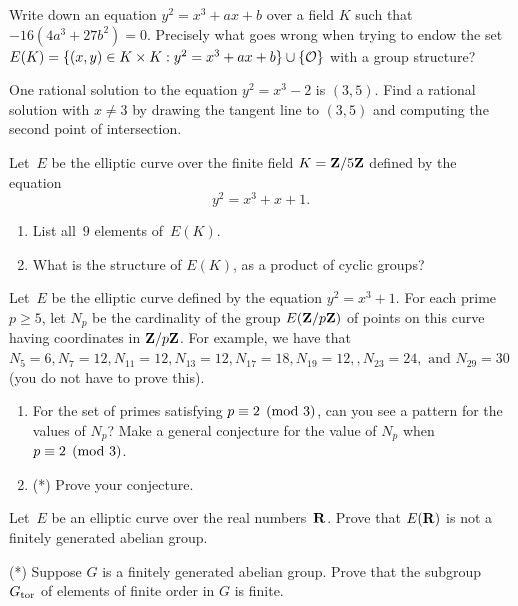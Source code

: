 \begin{exercises}
\item\label{ex:singgrp} Write down an equation $y^2 = x^3 +ax + b$ over a field
$K$ such that $-16(4a^3+27b^2)= 0$.  Precisely what goes wrong
when trying to endow the set
$E(K) = \{ (x,y)\in K\times K : y^2 = x^3 + ax +b \} \cup \{\mathcal{O}\}$
with a group structure?

\item\label{ex:ell2} One rational solution to the equation
$y^2=x^3-2$ is $(3,5)$.  Find a rational solution with $x\neq 3$ by
drawing the tangent line to $(3,5)$ and computing the second point of
intersection.

\item\label{ex:ell4}
Let~$E$ be the elliptic curve over the finite
field $K=\mathbf{Z}/5\mathbf{Z}$ defined by the equation
$$
y^2 = x^3 + x +1.
$$
\begin{enumerate}
\item List all~$9$ elements of~$E(K)$.
\item What is the structure of
$E(K)$, as a product of cyclic groups?
\end{enumerate}

\item\label{ex:ell11}
Let~$E$ be the elliptic curve
defined by the equation $y^2 = x^3 +1$.
For each prime $p\geq 5$, let $N_p$ be the cardinality of the group
$E(\mathbf{Z}/p\mathbf{Z}{})$ of points on this curve having coordinates
in $\mathbf{Z}/p\mathbf{Z}{}$.  For example, we have that
$N_{5} = 6, N_{7} = 12, N_{11} = 12, N_{13} = 12,
N_{17} = 18, N_{19} = 12, , N_{23} = 24, \text{ and }N_{29} = 30$
(you do not have to prove this).
\begin{enumerate}
\item  For the set of primes satisfying $p\equiv 2\pmod{3}$, can you see a
  pattern for the values of $N_p$?  Make a general conjecture for the
  value of $N_p$ when $p\equiv 2\pmod{3}$.
\item (*) Prove your conjecture.
\end{enumerate}

\item\label{ex:ell13}
Let~$E$ be an elliptic curve over the real numbers~$\mathbf{R}$.
Prove that $E(\mathbf{R})$ is not a finitely generated abelian group.


\item\label{ex:ector} (*)
Suppose $G$ is a finitely generated abelian group.
Prove that the subgroup $G_{\operatorname{tor}}$ of elements of finite
order in $G$ is finite.



\end{exercises}
